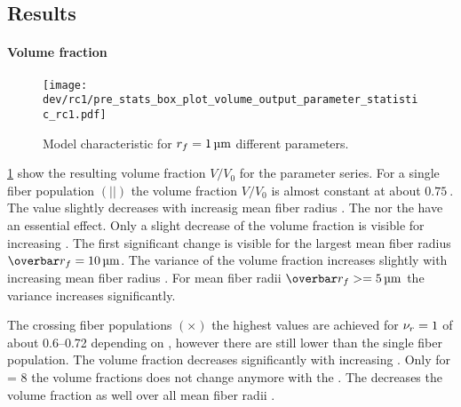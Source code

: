 \subsection{Results}
% 
\paragraph{Volume fraction}
% 
\begin{figure}[p]
\centering
\texttt{[image: dev/rc1/pre\_stats\_box\_plot\_volume\_output\_parameter\_statistic\_rc1.pdf]}
\caption[Model characteristics]{Model characteristic for $\fiberRadius = \SI{1}{\micro\meter}$ different parameters.}
\label{fig:psbp1}
\end{figure}
% 
\cref{fig:psbp1} show the resulting volume fraction $V/V_0$ for the parameter series.
For a single fiber population $(||)$ the volume fraction $V/V_0$ is almost constant at about $\SI{0.75}{}$.
The value slightly decreases with increasig mean fiber radius \fiberRadiusMean{}.
The \segLengthFactor{} nor the \segRadiusFactor{} have an essential effect.
Only a slight decrease of the volume fraction is visible for increasing \segLengthFactor{}.
The first significant change is visible for the largest mean fiber radius $\fiberRadiusMean=\SI{10}{\micro\meter}$.
The variance of the volume fraction increases slightly with increasing mean fiber radius \fiberRadiusMean{}.
For mean fiber radii $\fiberRadiusMean >= \SI{5}{\micro\meter}$ the variance increases significantly.
\par
% 
The crossing fiber populations $(\times)$ the highest values are achieved for $\textnormal{$\nu_{r}$}=\SI{1}{}$ of about \numrange{0.6}{0.72}{} depending on \fiberRadiusMean{}, however there are still lower than the single fiber population.
The volume fraction decreases significantly with increasing \segRadiusFactor{}.
Only for \segLengthFactor{} = 8 the volume fractions does not change anymore with the \segRadiusFactor{}.
The \segLengthFactor{} decreases the volume fraction as well over all mean fiber radii \fiberRadiusMean{}.
% 
